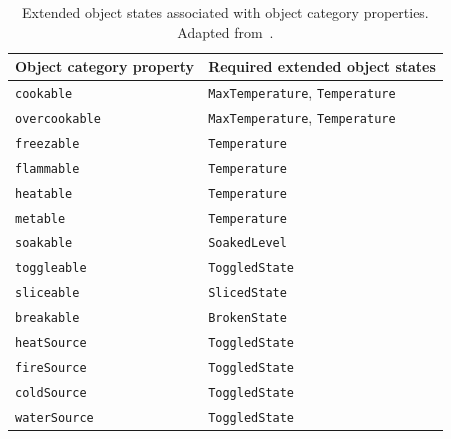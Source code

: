 \begin{table}[!htbp]
\begin{center}
{%
\scriptsize
\renewcommand{\arraystretch}{1.2}
\begin{tabular}{ | m{3.5cm} | m{3.7cm} | } 
\hline
\textbf{Object category property} & \textbf{Required extended object states}\\ 
\hline
\texttt{cookable} & \texttt{MaxTemperature}, \texttt{Temperature}\\ 
\hline
\texttt{overcookable} & \texttt{MaxTemperature}, \texttt{Temperature}\\ 
\hline
\texttt{freezable} & \texttt{Temperature}\\ 
\hline
\texttt{flammable} & \texttt{Temperature}\\ 
\hline
\texttt{heatable} & \texttt{Temperature}\\ 
\hline
\texttt{metable} & \texttt{Temperature}\\ 
\hline
\texttt{soakable} & \texttt{SoakedLevel}\\ 
\hline
\texttt{toggleable} & \texttt{ToggledState}\\ 
\hline
\texttt{sliceable} & \texttt{SlicedState}\\ 
\hline
\texttt{breakable} & \texttt{BrokenState}\\ 
\hline
\texttt{heatSource} & \texttt{ToggledState}\\ 
\hline
\texttt{fireSource} & \texttt{ToggledState}\\ 
\hline
\texttt{coldSource} & \texttt{ToggledState}\\ 
\hline
\texttt{waterSource} & \texttt{ToggledState}\\ 
\hline
\end{tabular}
}
\vspace{3pt}
\caption{Extended object states associated with object category properties. Adapted from~\cite{li2021ig2}.}
\label{table:obj_cat_prop}
\end{center}
\end{table}